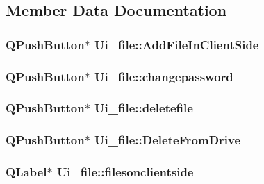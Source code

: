 \subsection{Member Data Documentation}
\hypertarget{classUi__file_a96e98cf341e50b713c96e9a4503d4890}{
\subsubsection[{Add\-File\-In\-Client\-Side}]{\setlength{\rightskip}{0pt plus 5cm}Q\-Push\-Button$\ast$ Ui\-\_\-file\-::\-Add\-File\-In\-Client\-Side}}\label{classUi__file_a96e98cf341e50b713c96e9a4503d4890}
\hypertarget{classUi__file_abd1f4e427dbb45b93faa49d7019687db}{
\subsubsection[{changepassword}]{\setlength{\rightskip}{0pt plus 5cm}Q\-Push\-Button$\ast$ Ui\-\_\-file\-::changepassword}}\label{classUi__file_abd1f4e427dbb45b93faa49d7019687db}
\hypertarget{classUi__file_af1e176f2ca2f2e345cde798d43f50327}{
\subsubsection[{deletefile}]{\setlength{\rightskip}{0pt plus 5cm}Q\-Push\-Button$\ast$ Ui\-\_\-file\-::deletefile}}\label{classUi__file_af1e176f2ca2f2e345cde798d43f50327}
\hypertarget{classUi__file_a9a10b6cb7393822676474186fa985c6e}{
\subsubsection[{Delete\-From\-Drive}]{\setlength{\rightskip}{0pt plus 5cm}Q\-Push\-Button$\ast$ Ui\-\_\-file\-::\-Delete\-From\-Drive}}\label{classUi__file_a9a10b6cb7393822676474186fa985c6e}
\hypertarget{classUi__file_ad2f4b79165dbb124ba2ff6e1f941975e}{
\subsubsection[{filesonclientside}]{\setlength{\rightskip}{0pt plus 5cm}Q\-Label$\ast$ Ui\-\_\-file\-::filesonclientside}}\label{classUi__file_ad2f4b79165dbb124ba2ff6e1f941975e}
